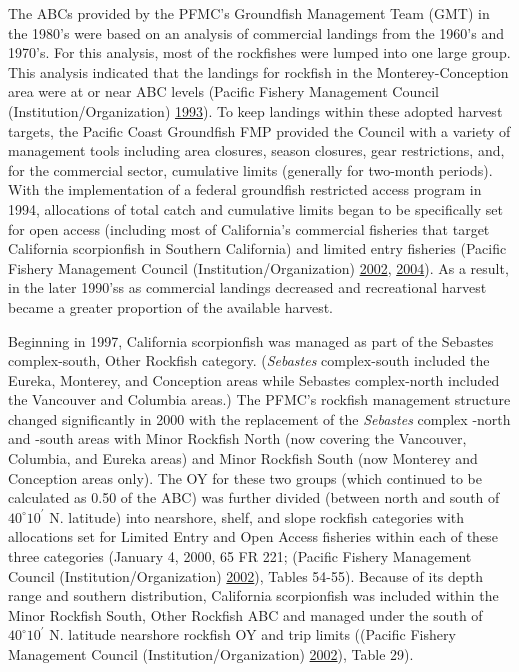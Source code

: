 \documentclass[12pt,]{article}
\begin{document}
The ABCs provided by the PFMC's Groundfish Management Team (GMT) in the
1980's were based on an analysis of commercial landings from the 1960's
and 1970's. For this analysis, most of the rockfishes were lumped into
one large group. This analysis indicated that the landings for rockfish
in the Monterey-Conception area were at or near ABC levels (Pacific
Fishery Management Council (Institution/Organization)
\protect\hyperlink{ref-PFMC1993}{1993}). To keep landings within these
adopted harvest targets, the Pacific Coast Groundfish FMP provided the
Council with a variety of management tools including area closures,
season closures, gear restrictions, and, for the commercial sector,
cumulative limits (generally for two-month periods). With the
implementation of a federal groundfish restricted access program in
1994, allocations of total catch and cumulative limits began to be
specifically set for open access (including most of California's
commercial fisheries that target California scorpionfish in Southern
California) and limited entry fisheries (Pacific Fishery Management
Council (Institution/Organization)
\protect\hyperlink{ref-PFMC2002}{2002},
\protect\hyperlink{ref-PFMC2004}{2004}). As a result, in the later
1990'ss as commercial landings decreased and recreational harvest became
a greater proportion of the available harvest.

Beginning in 1997, California scorpionfish was managed as part of the
Sebastes complex-south, Other Rockfish category. (\emph{Sebastes}
complex-south included the Eureka, Monterey, and Conception areas while
Sebastes complex-north included the Vancouver and Columbia areas.) The
PFMC's rockfish management structure changed significantly in 2000 with
the replacement of the \emph{Sebastes} complex -north and -south areas
with Minor Rockfish North (now covering the Vancouver, Columbia, and
Eureka areas) and Minor Rockfish South (now Monterey and Conception
areas only). The OY for these two groups (which continued to be
calculated as 0.50 of the ABC) was further divided (between north and
south of \(40^\circ 10^\prime\) N. latitude) into nearshore, shelf, and
slope rockfish categories with allocations set for Limited Entry and
Open Access fisheries within each of these three categories (January 4,
2000, 65 FR 221; (Pacific Fishery Management Council
(Institution/Organization) \protect\hyperlink{ref-PFMC2002}{2002}),
Tables 54-55). Because of its depth range and southern distribution,
California scorpionfish was included within the Minor Rockfish South,
Other Rockfish ABC and managed under the south of \(40^\circ 10^\prime\)
N. latitude nearshore rockfish OY and trip limits ((Pacific Fishery
Management Council (Institution/Organization)
\protect\hyperlink{ref-PFMC2002}{2002}), Table 29).
\end{document}
